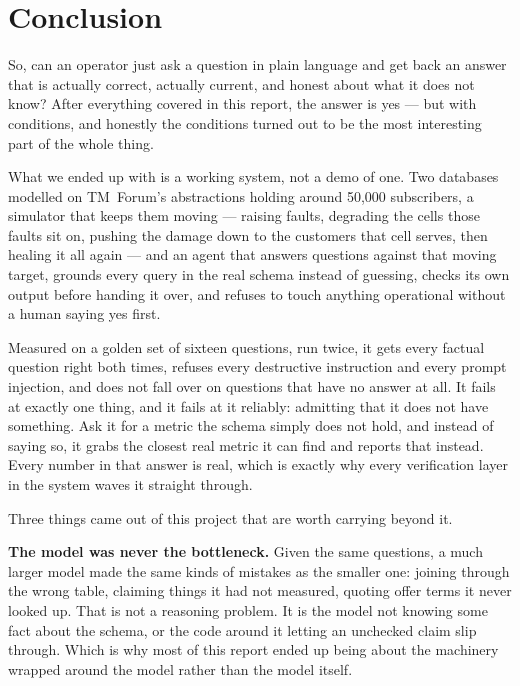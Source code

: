\chapter*{Conclusion}

So, can an operator just ask a question in plain language and get back an answer
that is actually correct, actually current, and honest about what it does not
know? After everything covered in this report, the answer is yes --- but with
conditions, and honestly the conditions turned out to be the most interesting
part of the whole thing.

What we ended up with is a working system, not a demo of one. Two databases
modelled on TM~Forum's abstractions holding around 50{,}000 subscribers, a
simulator that keeps them moving --- raising faults, degrading the cells those
faults sit on, pushing the damage down to the customers that cell serves, then
healing it all again --- and an agent that answers questions against that moving
target, grounds every query in the real schema instead of guessing, checks its
own output before handing it over, and refuses to touch anything operational
without a human saying yes first.

Measured on a golden set of sixteen questions, run twice, it gets every factual
question right both times, refuses every destructive instruction and every
prompt injection, and does not fall over on questions that have no answer at
all. It fails at exactly one thing, and it fails at it reliably: admitting that
it does not have something. Ask it for a metric the schema simply does not hold, and instead of
saying so, it grabs the closest real metric it can find and reports that
instead. Every number in that answer is real, which is exactly why every
verification layer in the system waves it straight through.

Three things came out of this project that are worth carrying beyond it.

\textbf{The model was never the bottleneck.} Given the same questions, a much
larger model made the same kinds of mistakes as the smaller one: joining through
the wrong table, claiming things it had not measured, quoting offer terms it
never looked up. That is not a reasoning problem. It is the model not knowing
some fact about the schema, or the code around it letting an unchecked claim
slip through. Which is why most of this report ended up being about the
machinery wrapped around the model rather than the model itself.

